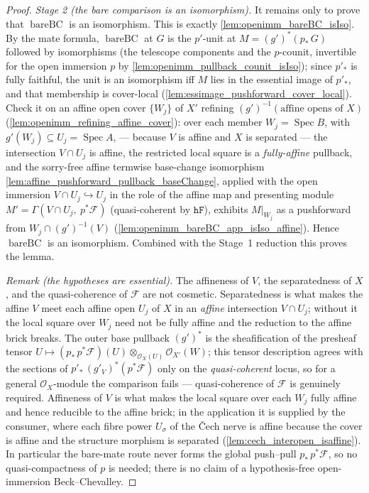 \begin{proof}
  \emph{Stage 2 (the bare comparison is an isomorphism).} It remains only to prove that
  \(\operatorname{bareBC}\) is an isomorphism. This is exactly \cref{lem:openimm_bareBC_isIso}.
  By the mate formula, \(\operatorname{bareBC}\) at \(G\) is the \(p'\)-unit at
  \(M = (g')^*(p_*\,G)\) followed by isomorphisms (the telescope components and the \(p\)-counit,
  invertible for the open immersion \(p\) by \cref{lem:openimm_pullback_counit_isIso}); since
  \(p'_*\) is fully faithful, the unit is an isomorphism iff \(M\) lies in the essential image of
  \(p'_*\), and that membership is cover-local (\cref{lem:essimage_pushforward_cover_local}).
  Check it on an affine open cover \(\{W_j\}\) of \(X'\) refining
  \((g')^{-1}(\text{affine opens of } X)\) (\cref{lem:openimm_refining_affine_cover}): over each
  member \(W_j = \operatorname{Spec} B\), with \(g'(W_j) \subseteq U_j = \operatorname{Spec} A\),
  --- because \(V\) is affine and \(X\) is separated --- the intersection \(V \cap U_j\) is
  affine, the restricted local square is a \emph{fully-affine} pullback, and the sorry-free
  affine termwise base-change isomorphism \cref{lem:affine_pushforward_pullback_baseChange},
  applied with the open immersion \(V \cap U_j \hookrightarrow U_j\) in the role of the affine
  map and presenting module \(M' = \Gamma(V \cap U_j,\ p^*\mathcal{F})\) (quasi-coherent by
  \(\mathtt{hF}\)), exhibits \(M|_{W_j}\) as a pushforward from \(W_j \cap (g')^{-1}(V)\)
  (\cref{lem:openimm_bareBC_app_isIso_affine}). Hence \(\operatorname{bareBC}\) is an
  isomorphism. Combined with the Stage~1 reduction this proves the lemma.

  \emph{Remark (the hypotheses are essential).} The affineness of \(V\), the separatedness of
  \(X\), and the quasi-coherence of \(\mathcal{F}\) are not cosmetic. Separatedness is what makes
  the affine \(V\) meet each affine open \(U_j\) of \(X\) in an \emph{affine} intersection
  \(V \cap U_j\); without it the local square over \(W_j\) need not be fully affine and the
  reduction to the affine brick breaks. The outer base pullback \((g')^*\) is the sheafification
  of the presheaf tensor \(U \mapsto (p_*\,p^*\mathcal{F})(U) \otimes_{\mathcal{O}_X(U)}
  \mathcal{O}_{X'}(W)\); this tensor description agrees with the sections of
  \(p'_*\,(g'_V)^*(p^*\mathcal{F})\) only on the \emph{quasi-coherent} locus, so for a general
  \(\mathcal{O}_X\)-module the comparison fails --- quasi-coherence of \(\mathcal{F}\) is genuinely
  required. Affineness of \(V\) is what makes the local square over each \(W_j\) fully affine and
  hence reducible to the affine brick; in the application it is supplied by the consumer, where
  each fibre power \(U_\sigma\) of the {\v C}ech nerve is affine because the cover is affine and
  the structure morphism is separated (\cref{lem:cech_interopen_isaffine}). In particular the
  bare-mate route never forms the global push--pull \(p_*\,p^*\mathcal{F}\), so no
  quasi-compactness of \(p\) is needed; there is no claim of a hypothesis-free open-immersion
  Beck--Chevalley.
\end{proof}

